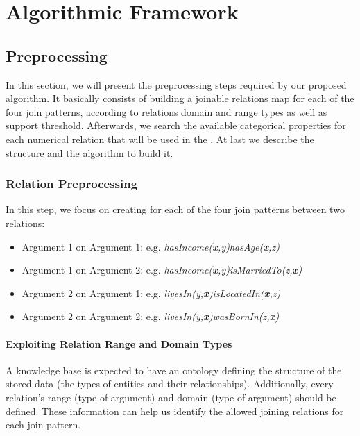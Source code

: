 \chapter{Algorithmic Framework}
\label{ch:intro}

\section{Preprocessing}

In this section, we will present the preprocessing steps required by our proposed algorithm. It basically consists of building a joinable relations map for each of the four join patterns, according to relations domain and range types as well as support threshold. Afterwards, we search the available categorical properties for each numerical relation that will be used in the \graphname. At last we describe the \graphname structure and the algorithm to build it.

\subsection{Relation Preprocessing}

In this step, we focus on creating for each of the four join patterns between two relations:

\begin{itemize}
 \item Argument 1 on Argument 1: e.g. \emph{hasIncome(\textbf{x},y)hasAge(\textbf{x},z)}
 \item Argument 1 on Argument 2: e.g. \emph{hasIncome(\textbf{x},y)isMarriedTo(z,\textbf{x})}
 \item Argument 2 on Argument 1: e.g. \emph{livesIn(y,\textbf{x})isLocatedIn(\textbf{x},z)}
 \item Argument 2 on Argument 2: e.g. \emph{livesIn(y,\textbf{x})wasBornIn(z,\textbf{x})}
\end{itemize}



\subsubsection{Exploiting Relation Range and Domain Types}

A knowledge base is expected to have an ontology defining the structure of the stored data (the types of entities and their relationships). Additionally, every relation's range (type of  argument) and domain (type of  argument) should be defined. These information can help us identify the allowed joining relations for each join pattern.

